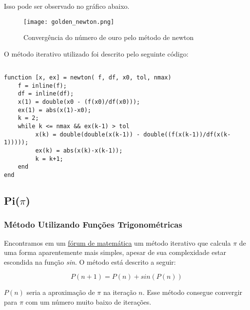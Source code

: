 Isso pode ser observado no gráfico abaixo.

\begin{figure}[H]
    \centering
    \texttt{[image: golden\_newton.png]}
    \caption{Convergência do número de ouro pelo método de newton}
    \label{golden_newton}
\end{figure}

\newpage

O método iterativo utilizado foi descrito pelo seguinte código:

\begin{lstlisting}

function [x, ex] = newton( f, df, x0, tol, nmax)
	f = inline(f);
	df = inline(df);
	x(1) = double(x0 - (f(x0)/df(x0)));
	ex(1) = abs(x(1)-x0);
	k = 2;
	while k <= nmax && ex(k-1) > tol
		 x(k) = double(double(x(k-1)) - double((f(x(k-1))/df(x(k-1)))));
		 ex(k) = abs(x(k)-x(k-1));
		 k = k+1;
	end
end

\end{lstlisting}

\subsection{Pi($\pi$)}

\subsubsection{Método Utilizando Funções Trigonométricas}

Encontramos em um
\href{http://mathforum.org/library/drmath/view/65244.html}{fórum de matemática}
um método iterativo que calcula $ \pi $ de uma forma aparentemente mais simples,
apesar de sua complexidade estar escondida na função \emph{sin}. O método está
descrito a seguir:

\begin{equation}
\label{magic_equation}
P(n+1) = P(n) + sin(P(n))
\end{equation}

$P(n)$ seria a aproximação de $\pi$ na iteração $n$. Esse método consegue
convergir para $\pi$ com um número muito baixo de iterações.

